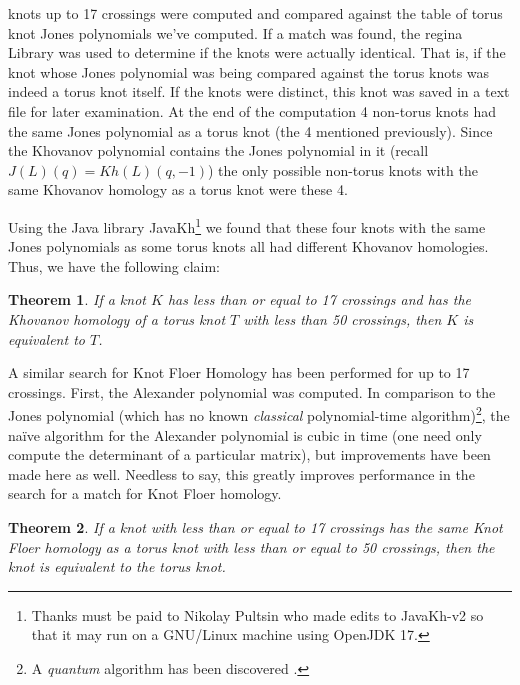 \documentclass{article}
\theoremstyle{plain}
\newtheorem{theorem}{Theorem}
\begin{document}
        knots up to 17 crossings were computed and compared against the table of
        torus knot Jones polynomials we've computed. If a match was found,
        the regina Library was used to determine if the knots were actually
        identical. That is, if the knot whose Jones polynomial was being
        compared against the torus knots was indeed a torus knot itself. If the
        knots were distinct, this knot was saved in a text file for later
        examination. At the end of the computation 4 non-torus knots had the
        same Jones polynomial as a torus knot (the 4 mentioned previously).
        Since the Khovanov polynomial contains the Jones polynomial in it
        (recall $J(L)(q)=Kh(L)(q,-1)$) the only possible non-torus knots with
        the same Khovanov homology as a torus knot were these 4.
        \par\hfill\par
        Using the Java library JavaKh\footnote{%
            Thanks must be paid to Nikolay Pultsin who made edits to
            JavaKh-v2 so that it may run on a GNU/Linux machine using
            OpenJDK 17.
        }
        we found that these four knots with the same Jones polynomials as some
        torus knots all had different Khovanov homologies. Thus, we have the
        following claim:
        \begin{theorem}
            If a knot $K$ has less than or equal to 17 crossings and has the
            Khovanov homology of a torus knot $T$ with less than 50 crossings,
            then $K$ is equivalent to $T$.
        \end{theorem}
        A similar search for Knot Floer Homology has been performed for up to 17
        crossings. First, the Alexander polynomial was computed.
        In comparison to the Jones polynomial (which has no known
        \textit{classical} polynomial-time algorithm)\footnote{%
            A \textit{quantum} algorithm has been discovered
            \cite{JonesQuantumAlgorithm}.
        }, the na\"{i}ve algorithm for the Alexander polynomial is cubic in
        time (one need only compute the determinant of a particular matrix), but
        improvements have been made here as well. Needless to say, this greatly
        improves performance in the search for a match for Knot Floer homology.
        \begin{theorem}
            If a knot with less than or equal to 17 crossings has the same
            Knot Floer homology as a torus knot with less than or equal to 50
            crossings, then the knot is equivalent to the torus knot.
        \end{theorem}
\end{document}
